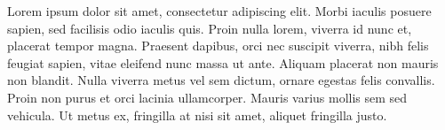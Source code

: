 Lorem ipsum dolor sit amet, consectetur adipiscing elit. Morbi iaculis posuere sapien, sed facilisis odio iaculis quis. 
Proin nulla lorem, viverra id nunc et, placerat tempor magna. Praesent dapibus, orci nec suscipit viverra, nibh felis feugiat sapien, 
vitae eleifend nunc massa ut ante. Aliquam placerat non mauris non blandit. Nulla viverra metus vel sem dictum, ornare egestas felis convallis. 
Proin non purus et orci lacinia ullamcorper. Mauris varius mollis sem sed vehicula. Ut metus ex, fringilla at nisi sit amet, aliquet fringilla justo.


